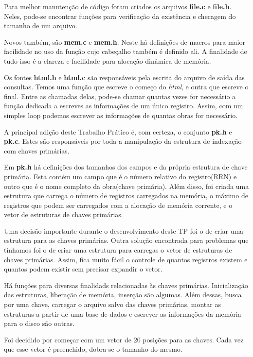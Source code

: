 \documentclass{article}
\begin{document}
Para melhor manutenção de código foram criados os arquivos \textbf{file.c} e \textbf{file.h}. Neles, pode-se encontrar funções para verificação da existência e checagem do tamanho de um arquivo.

Novos também, são \textbf{mem.c} e \textbf{mem.h}. Neste há definições de macros para maior facilidade no uso da função cujo cabeçalho também é definido ali. A finalidade de tudo isso é a clareza e facilidade para alocação dinâmica de memória.

Os fontes \textbf{html.h} e \textbf{html.c} são responsáveis pela escrita do arquivo de saída das consultas. Temos uma função que escreve o começo do \textit{html}, e outra que escreve o final. Entre as chamadas delas, pode-se chamar quantas vezes for necessário a função dedicada a escreves as informações de um único registro. Assim, com um simples loop podemos escrever as informações de quantas obras for necessário.

A principal adição deste Trabalho Prático é, com certeza, o conjunto \textbf{pk.h} e \textbf{pk.c}. Estes são responsáveis por toda a manipulação da estrutura de indexação com chaves primárias.

Em \textbf{pk.h} há definições dos tamanhos dos campos e da própria estrutura de chave primária. Esta contém um campo que é o número relativo do registro(RRN) e outro que é o nome completo da obra(chave primária). Além disso, foi criada uma estrutura que carrega o número de registros carregados na memória, o máximo de registros que podem ser carregados com a alocação de memória corrente, e o vetor de estruturas de chaves primárias. 

Uma decisão importante durante o desenvolvimento deste TP foi o de criar uma estrutura para as chaves primárias. Outra solução encontrada para problemas que tínhamos foi o de criar uma estrutura para carregas o vetor de estruturas de chaves primárias. Assim, fica muito fácil o controle de quantos registros existem e quantos podem existir sem precisar expandir o vetor.

Há funções para diversas finalidads relacionadas às chaves primárias. Inicialização das estruturas, liberação de memória, inserção são algumas. Além dessas, busca por uma chave, carregar o arquivo salvo das chaves primárias, montar as estruturas a partir de uma base de dados e escrever as informações da memória para o disco são outras.

Foi decidido por começar com um vetor de 20 posições para as chaves. Cada vez que esse vetor é preenchido, dobra-se o tamanho do mesmo.
\end{document}
